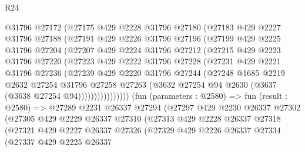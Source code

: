 \begin{lexlean}{R24}
\begin{coremodule}
              @31796
              @27172
              (@27175
                @429
                @2228
                @31796
                @27180
                (@27183
                  @429
                  @2227
                  @31796
                  @27188
                  (@27191
                    @429
                    @2226
                    @31796
                    @27196
                    (@27199
                      @429
                      @2225
                      @31796
                      @27204
                      (@27207
                        @429
                        @2224
                        @31796
                        @27212
                        (@27215
                          @429
                          @2223
                          @31796
                          @27220
                          (@27223
                            @429
                            @2222
                            @31796
                            @27228
                            (@27231
                              @429
                              @2221
                              @31796
                              @27236
                              (@27239
                                @429
                                @2220
                                @31796
                                @27244
                                (@27248
                                  @1685
                                  @2219
                                  @2632
                                  @27254
                                  @31796
                                  @27258
                                  @27263
                                  (@3632 @27254 @94 @2630 (@3637 (@3638 @27254 @94))))))))))))))))
        (fun (parameters : @2580) =>
        fun (result : @2580) =>
        @27289
          @2231
          @26337
          @27294
          (@27297
            @429
            @2230
            @26337
            @27302
            (@27305
              @429
              @2229
              @26337
              @27310
              (@27313
                @429
                @2228
                @26337
                @27318
                (@27321
                  @429
                  @2227
                  @26337
                  @27326
                  (@27329
                    @429
                    @2226
                    @26337
                    @27334
                    (@27337
                      @429
                      @2225
                      @26337

\end{coremodule}
\end{lexlean}
